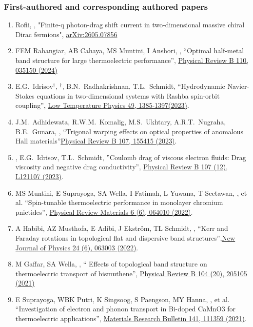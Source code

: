 \subsubsection*{First-authored and corresponding authored papers}
\begin{enumerate}
\item Rofii, \hes, "Finite-q photon-drag shift current in two-dimensional massive chiral Dirac fermions", \href{https://doi.org/10.48550/arXiv.2605.07856}{arXiv:2605.07856}
\item FEM Rahangiar, AB Cahaya, MS Muntini, I Anshori, \hes, ``Optimal half-metal band structure for large thermoelectric performance'', \href{https://journals.aps.org/prb/abstract/10.1103/PhysRevB.110.035150}{Physical Review B 110, 035150 (2024)}
\item E.G.~Idrisov$^\dagger$, \hes$^\dagger$, B.N.~Radhakrishnan, T.L.~Schmidt, ``Hydrodynamic Navier-Stokes equations in two-dimensional systems with Rashba spin-orbit coupling'', \href{https://doi.org/10.1063/10.0022364}{Low Temperature Physics 49, 1385-1397(2023)}.
\item J.M.~Adhidewata, R.W.M.~Komalig, M.S.~Ukhtary, A.R.T.~Nugraha, B.E.~Gunara, \hes, ``Trigonal warping effects on optical properties of anomalous Hall materials''\href{https://doi.org/10.1103/PhysRevB.107.155415}{Physical Review B 107, 155415 (2023)}.
\item \hes, E.G.~Idrisov, T.L.~Schmidt, ''Coulomb drag of viscous electron fluids: Drag viscosity and negative drag conductivity'', \href{https://doi.org/10.1103/PhysRevB.107.L121107}{Physical Review B 107 (12), L121107 (2023)}.
\item MS Muntini, E Suprayoga, SA Wella, I Fatimah, L Yuwana, T Seetawan, \hes, et al. ``Spin-tunable thermoelectric performance in monolayer chromium pnictides'', \href{https://doi.org/10.1103/PhysRevMaterials.6.064010}{Physical Review Materials 6 (6), 064010 (2022)}.
\item A Habibi, AZ Musthofa, E Adibi, J Ekström, TL Schmidt, \hes, ``Kerr and Faraday rotations in topological flat and dispersive band structures'',\href{https://iopscience.iop.org/article/10.1088/1367-2630/ac706d/meta}{New Journal of Physics 24 (6), 063003 (2022)}.
\item M Gaffar, SA Wella, \hes, `` Effects of topological band structure on thermoelectric transport of bismuthene'', \href{https://journals.aps.org/prb/abstract/10.1103/PhysRevB.104.205105}{Physical Review B 104 (20), 205105 (2021)}
\item E Suprayoga, WBK Putri, K Singsoog, S Paengson, MY Hanna, \hes, et al. ``Investigation of electron and phonon transport in Bi-doped CaMnO3 for thermoelectric applications'', \href{https://doi.org/10.1016/j.materresbull.2021.111359}{Materials Research Bulletin 141, 111359 (2021)}.

\end{enumerate}
